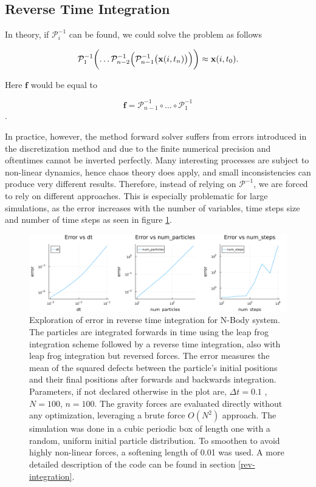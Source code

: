 \documentclass{article}
\begin{document}
\subsection{Reverse Time Integration}
 
In theory, if $\mathcal{P}_i^{-1}$ can be found, we could solve the problem as follows

\begin{equation}
    \mathcal{P}_{1}^{-1} \biggl( \dots \mathcal{P}_{n-2}^{-1}\Bigl(\mathcal{P}_{n-1}^{-1}\bigl(\mathbf{x}(i, t_{n})\bigr)\Bigr)\biggr) \approx \mathbf{x}(i, t_{0}).
\end{equation}

Here $\mathbf{f}$ would be equal to 

\begin{equation}
    \mathbf{f} = \mathcal{P}_{n-1}^{-1} \circ \dots \circ \mathcal{P}_1^{-1}
\end{equation}.

In practice, however, the method forward solver suffers from errors introduced in the discretization method and due to the finite numerical precision and oftentimes cannot be inverted perfectly. Many interesting processes are subject to non-linear dynamics, hence chaos theory does apply, and small inconsistencies can produce very different results. Therefore, instead of relying on $\mathcal{P}^{-1}$, we are forced to rely on different approaches. This is especially problematic for large simulations, as the error increases with the number of variables, time steps size and number of time steps as seen in figure \ref{fig:error_inverse}.

\begin{figure}
    \centering
    \includegraphics[width=0.8\linewidth]{img/error.png}
    \caption{Exploration of error in reverse time integration for N-Body system. The particles are integrated forwards in time using the leap frog integration scheme followed by a reverse time integration, also with leap frog integration but reversed forces. The error measures the mean of the squared defects between the particle's initial positions and their final positions after forwards and backwards integration. Parameters, if not declared otherwise in the plot are, $\Delta t= 0.1$ , $N = 100$, $n = 100$. The gravity forces are evaluated directly without any optimization, leveraging a brute force $O(N^2)$ approach. The simulation was done in a cubic periodic box of length one with a random, uniform initial particle distribution. To smoothen to avoid highly non-linear forces, a softening length of 0.01 was used. A more detailed description of the code can be found in section \ref{rev-integration}.}
    \label{fig:error_inverse}
\end{figure}
\end{document}
